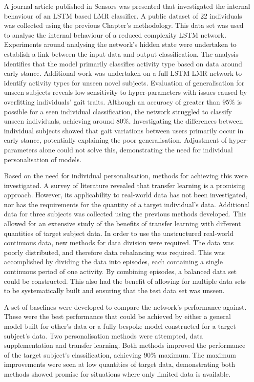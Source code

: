 A journal article published in Sensors was presented that investigated the internal behaviour of an LSTM based LMR classifier. A public dataset of 22 individuals was collected using the previous Chapter's methodology. This data set was used to analyse the internal behaviour of a reduced complexity LSTM network. Experiments around analysing the network's hidden state were undertaken to establish a link between the input data and output classification. The analysis identifies that the model primarily classifies activity type based on data around early stance. Additional work was undertaken on a full LSTM LMR network to identify activity types for unseen novel subjects. Evaluation of generalisation for unseen subjects reveals low sensitivity to hyper-parameters with issues caused by overfitting individuals' gait traits. Although an accuracy of greater than $95\%$ is possible for a seen individual classification, the network struggled to classify unseen individuals, achieving around $80\%$. Investigating the differences between individual subjects showed that gait variations between users primarily occur in early stance, potentially explaining the poor generalisation. Adjustment of hyper-parameters alone could not solve this, demonstrating the need for individual personalisation of models.

Based on the need for individual personalisation, methods for achieving this were investigated. A survey of literature revealed that transfer learning is a promising approach. However, its applicability to real-world data has not been investigated, nor has the requirements for the quantity of a target individual's data. Additional data for three subjects was collected using the previous methods developed. This allowed for an extensive study of the benefits of transfer learning with different quantities of target subject data. In order to use the unstructured real-world continuous data, new methods for data division were required. The data was poorly distributed, and therefore data rebalancing was required. This was accomplished by dividing the data into episodes, each containing a single continuous period of one activity. By combining episodes, a balanced data set could be constructed. This also had the benefit of allowing for multiple data sets to be systematically built and ensuring that the test data set was unseen.

A set of baselines were developed to compare the network's performance against. These were the best performance that could be achieved by either a general model built for other's data or a fully bespoke model constructed for a target subject's data. Two personalisation methods were attempted, data supplementation and transfer learning. Both methods improved the performance of the target subject's classification, achieving $90\%$ maximum. The maximum improvements were seen at low quantities of target data, demonstrating both methods showed promise for situations where only limited data is available.

